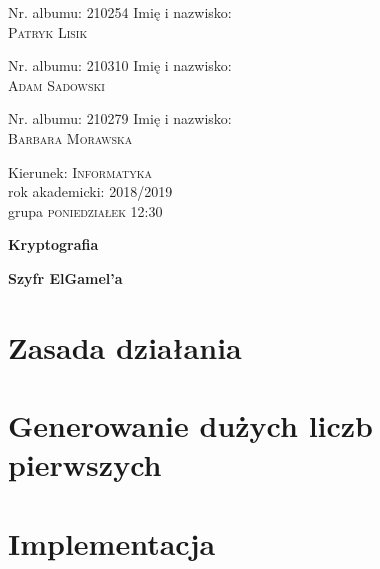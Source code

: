 \documentclass{article}
\begin{document}
    
    \begin{titlepage}
    
    \begin{minipage}{0.33 \textwidth}
    \begin{flushleft}
    \large
    Nr. albumu: \textsc{210254}\linebreak
    Imię i nazwisko:\\
    \textsc{Patryk Lisik}
    \end{flushleft}
    \end{minipage}
    \hspace{0.2\textwidth}
    \begin{minipage}{0.33 \textwidth}
    \begin{flushleft}
    \large
    Nr. albumu: \textsc{210310}\linebreak
    Imię i nazwisko:\\
    \textsc{Adam Sadowski}
    \end{flushleft}
    \end{minipage}

    \vspace{1.5cm}

    \begin{minipage}{0.33 \textwidth}
        \begin{flushleft}
        \large
        Nr. albumu: \textsc{210279}\linebreak
        Imię i nazwisko:\\
        \textsc{Barbara Morawska}
        \end{flushleft}
        \end{minipage}
    
    \vspace{3cm}
    
    \begin{minipage}{0.9\textwidth}
    \begin{flushleft}
    \Large
    Kierunek: \textsc{Informatyka} \\
    rok akademicki: \textsc{2018/2019} \\
    grupa \textsc{poniedziałek 12:30} \linebreak\linebreak
    \end{flushleft}
    \end{minipage}
    
    \vspace{3cm}
    
    {\center\huge\bfseries Kryptografia \par}
    \vspace{1.5cm}
    {\center\huge\bfseries Szyfr ElGamel'a \par}
    
    \end{titlepage}

    \section{Zasada działania}
    \section{Generowanie dużych liczb pierwszych}
    \section{Implementacja}
    
\end{document}
